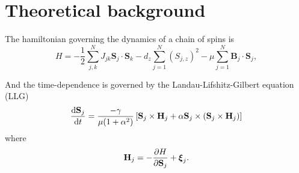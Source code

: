 \section{Theoretical background}

The hamiltonian governing the dynamics of a chain of spins is
\begin{equation}\label{eq:hamiltionian}
	H = - \frac{1}{2} \sum_{j,k}^{N} J_{jk} \mathbf{S}_j \cdot \mathbf{S}_k - d_z \sum_{j=1}^{N} (S_{j,z})^2 - \mu \sum_{j=1}^{N} \mathbf{B}_j \cdot \mathbf{S}_j,
\end{equation}

And the time-dependence is governed by the Landau-Lifshitz-Gilbert equation (LLG) 
\begin{equation}\label{eq:llg}
	\frac{\text{d} \mathbf{S}_j}{\text{d} t} = \frac{-\gamma}{\mu(1 + \alpha^2)} \left[ \mathbf{S}_j \times \mathbf{H}_j + \alpha \mathbf{S}_j \times (\mathbf{S}_j \times \mathbf{H}_j) \right]
\end{equation}
where
\begin{equation}\label{eq:ef_field}
	\mathbf{H}_j = -\frac{\partial H}{\partial \mathbf{S}_j} + \boldsymbol{\xi}_j.
\end{equation}

